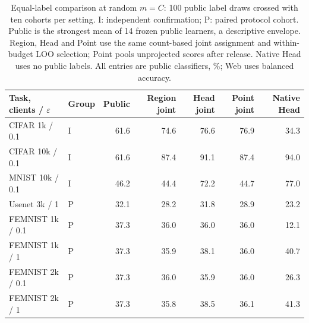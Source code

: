 \begin{table}[t]
\caption{Equal-label comparison at random $m=C$: 100 public label draws crossed with ten cohorts per setting. I: independent confirmation; P: paired protocol cohort. Public is the strongest mean of 14 frozen public learners, a descriptive envelope. Region, Head and Point use the same count-based joint assignment and within-budget LOO selection; Point pools unprojected scores after release. Native Head uses no public labels. All entries are public classifiers, \%; Web uses balanced accuracy.}
\label{tab:joint-controls}\small
\centering
\begin{tabular}{@{}llrrrrr@{}}\toprule
Task, clients / $\varepsilon$ & Group & Public & Region joint & Head joint & Point joint & Native Head \\
\midrule
CIFAR 1k / 0.1 & I & 61.6 & 74.6 & 76.6 & 76.9 & 34.3 \\
CIFAR 10k / 0.1 & I & 61.6 & 87.4 & 91.1 & 87.4 & 94.0 \\
MNIST 10k / 0.1 & I & 46.2 & 44.4 & 72.2 & 44.7 & 77.0 \\
Usenet 3k / 1 & P & 32.1 & 28.2 & 31.8 & 28.9 & 23.2 \\
FEMNIST 1k / 0.1 & P & 37.3 & 36.0 & 36.0 & 36.0 & 12.1 \\
FEMNIST 1k / 1 & P & 37.3 & 35.9 & 38.1 & 36.0 & 40.7 \\
FEMNIST 2k / 0.1 & P & 37.3 & 36.0 & 35.9 & 36.0 & 26.3 \\
FEMNIST 2k / 1 & P & 37.3 & 35.8 & 38.5 & 36.1 & 41.3 \\
\bottomrule\end{tabular}
\end{table}
